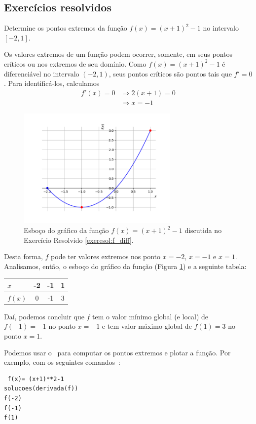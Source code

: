 \cleardoublepage\documentclass[../main.tex]{subfiles}
\begin{document}
\subsection{Exercícios resolvidos}

\begin{exeresol}\label{exeresol:f_diff}
  Determine os pontos extremos da função $f(x) = (x+1)^2-1$ no intervalo $[-2,1]$.
\end{exeresol}
\begin{resol}
  Os valores extremos de um função podem ocorrer, somente, em seus pontos críticos ou nos extremos de seu domínio. Como $f(x) = (x+1)^2-1$ é diferenciável no intervalo $(-2,1)$, seus pontos críticos são pontos tais que $f'=0$. Para identificá-los, calculamos
  \begin{align*}
    f'(x)=0 &\Rightarrow 2(x+1) = 0\\
            &\Rightarrow x = -1
  \end{align*}

  \begin{figure}[htb]
    \centering
    \includegraphics[width=0.7\textwidth]{./fig_apl_deriv/fig_exeresol_f_diff}
    \caption{Esboço do gráfico da função $f(x) = (x+1)^2-1$ discutida no Exercício Resolvido \ref{exeresol:f_diff}.}
    \label{fig:exeresol_f_diff}
  \end{figure}

  Desta forma, $f$ pode ter valores extremos nos ponto $x=-2$, $x=-1$ e $x=1$. Analisamos, então, o esboço do gráfico da função (Figura \ref{fig:exeresol_f_diff}) e a seguinte tabela:\\
  \begin{center}
  \begin{tabular}[H]{l|ccc}
    $x$ & -2 & -1 & 1 \\\hline
    $f(x)$ & 0 & -1 & 3\\\hline
  \end{tabular}
\end{center}
Daí, podemos concluir que $f$ tem o valor mínimo global (e local) de $f(-1)=-1$ no ponto $x=-1$ e tem valor máximo global de $f(1)=3$ no ponto $x=1$.


Podemos usar o \geogebra~para computar os pontos extremos e plotar a função. Por exemplo, com os seguintes comandos~:
\begin{verbatim}
 f(x)= (x+1)**2-1
solucoes(derivada(f))
f(-2)
f(-1)
f(1)
\end{verbatim}
\end{resol}
\end{document}
